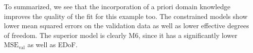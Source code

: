 To summarized, we see that the incorporation of a priori domain knowledge improves the quality of the fit for this example too. The constrained models show lower mean squared errors on the validation data as well as lower effective degrees of freedom. The superior model is clearly M6, since it has a significantly lower $\text{MSE}_{\text{val}}$ as well as EDoF. 
